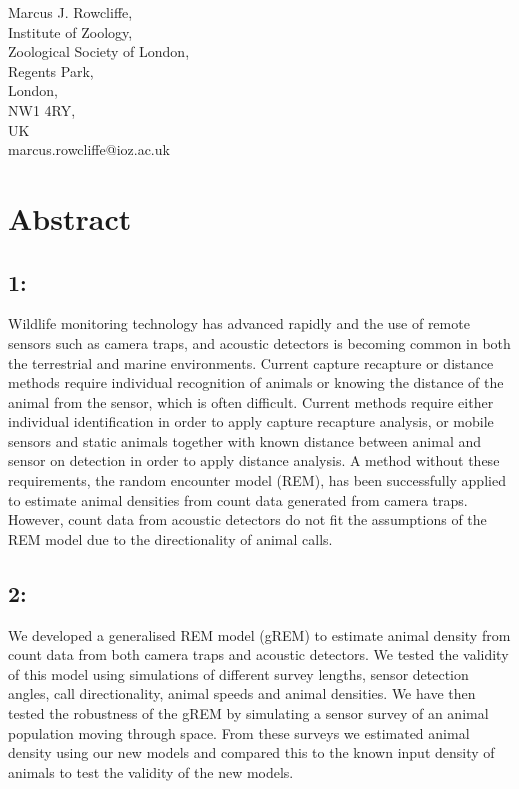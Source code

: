 \documentclass[a4paper,10pt,reqno,oneside]{amsart}
\begin{document}
Marcus J. Rowcliffe, \\
Institute of Zoology, \\
Zoological Society of London, \\
Regents Park, \\
London, \\
NW1 4RY, \\
UK \\
marcus.rowcliffe@ioz.ac.uk


\clearpage



\section{Abstract}
\subsection*{1:}  Wildlife monitoring technology has advanced rapidly and the use of remote sensors such as camera traps, and acoustic detectors is becoming common in both the terrestrial and marine environments. Current capture recapture or distance methods require individual recognition of animals or knowing the distance of the animal from the sensor, which is often difficult. Current methods require either individual identification in order to apply capture recapture analysis, or mobile sensors and static animals together with known distance between animal and sensor on detection in order to apply distance analysis. A method without these requirements, the random encounter model (REM), has been successfully applied to estimate animal densities from count data generated from camera traps. However, count data from acoustic detectors do not fit the assumptions of the REM model due to the directionality of animal calls.

\subsection*{2:} We developed a generalised REM model (gREM) to estimate animal density from count data from both camera traps and acoustic detectors. We tested the validity of this model using simulations of different survey lengths, sensor detection angles, call directionality, animal speeds and animal densities. We have then tested the robustness of the gREM by simulating a sensor survey of an animal population moving through space. From these surveys we estimated animal density using our new models and compared this to the known input density of animals to test the validity of the new models.
\end{document}

